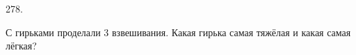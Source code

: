 278. \begin{center}
\begin{figure}[ht!]
\end{figure}
\end{center}
С гирьками проделали 3 взвешивания. Какая гирька самая тяжёлая и какая самая лёгкая?\\
